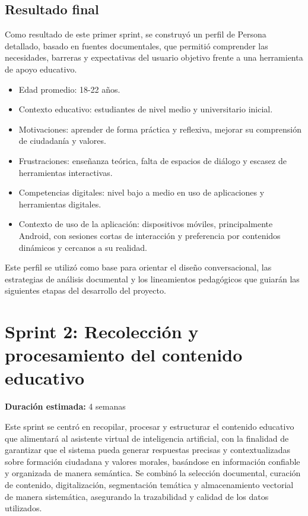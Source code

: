 \subsection{Resultado final}
Como resultado de este primer sprint, se construyó un perfil de Persona
detallado, basado en fuentes documentales, que permitió comprender las
necesidades, barreras y expectativas del usuario objetivo frente a una
herramienta de apoyo educativo.

\begin{itemize}
      \item Edad promedio: 18-22 años.
      \item Contexto educativo: estudiantes de nivel medio y universitario inicial.
      \item Motivaciones: aprender de forma práctica y reflexiva, mejorar su comprensión de
            ciudadanía y valores.
      \item Frustraciones: enseñanza teórica, falta de espacios de diálogo y escasez de
            herramientas interactivas.
      \item Competencias digitales: nivel bajo a medio en uso de aplicaciones y
            herramientas digitales.
      \item Contexto de uso de la aplicación: dispositivos móviles, principalmente Android,
            con sesiones cortas de interacción y preferencia por contenidos dinámicos y
            cercanos a su realidad.
\end{itemize}

Este perfil se utilizó como base para orientar el diseño conversacional, las
estrategias de análisis documental y los lineamientos pedagógicos que guiarán
las siguientes etapas del desarrollo del proyecto.

\section{Sprint 2: Recolección y procesamiento del contenido educativo}
\textbf{Duración estimada:} 4 semanas

Este sprint se centró en recopilar, procesar y estructurar el contenido
educativo que alimentará al asistente virtual de inteligencia artificial, con
la finalidad de garantizar que el sistema pueda generar respuestas precisas y
contextualizadas sobre formación ciudadana y valores morales, basándose en
información confiable y organizada de manera semántica. Se combinó la selección
documental, curación de contenido, digitalización, segmentación temática y
almacenamiento vectorial de manera sistemática, asegurando la trazabilidad y
calidad de los datos utilizados.

